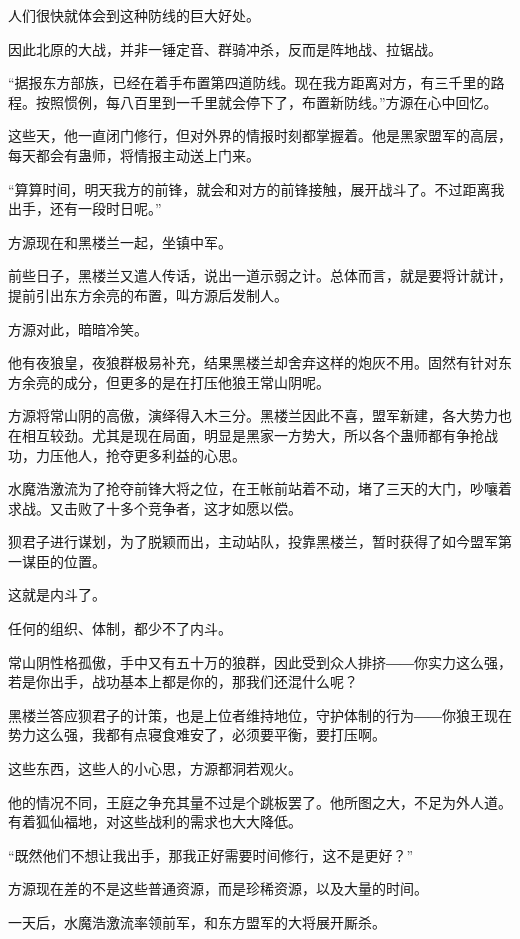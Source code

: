 \begin{this_body}
人们很快就体会到这种防线的巨大好处。

因此北原的大战，并非一锤定音、群骑冲杀，反而是阵地战、拉锯战。

“据报东方部族，已经在着手布置第四道防线。现在我方距离对方，有三千里的路程。按照惯例，每八百里到一千里就会停下了，布置新防线。”方源在心中回忆。

这些天，他一直闭门修行，但对外界的情报时刻都掌握着。他是黑家盟军的高层，每天都会有蛊师，将情报主动送上门来。

“算算时间，明天我方的前锋，就会和对方的前锋接触，展开战斗了。不过距离我出手，还有一段时日呢。”

方源现在和黑楼兰一起，坐镇中军。

前些日子，黑楼兰又遣人传话，说出一道示弱之计。总体而言，就是要将计就计，提前引出东方余亮的布置，叫方源后发制人。

方源对此，暗暗冷笑。

他有夜狼皇，夜狼群极易补充，结果黑楼兰却舍弃这样的炮灰不用。固然有针对东方余亮的成分，但更多的是在打压他狼王常山阴呢。

方源将常山阴的高傲，演绎得入木三分。黑楼兰因此不喜，盟军新建，各大势力也在相互较劲。尤其是现在局面，明显是黑家一方势大，所以各个蛊师都有争抢战功，力压他人，抢夺更多利益的心思。

水魔浩激流为了抢夺前锋大将之位，在王帐前站着不动，堵了三天的大门，吵嚷着求战。又击败了十多个竞争者，这才如愿以偿。

狈君子进行谋划，为了脱颖而出，主动站队，投靠黑楼兰，暂时获得了如今盟军第一谋臣的位置。

这就是内斗了。

任何的组织、体制，都少不了内斗。

常山阴性格孤傲，手中又有五十万的狼群，因此受到众人排挤――你实力这么强，若是你出手，战功基本上都是你的，那我们还混什么呢？

黑楼兰答应狈君子的计策，也是上位者维持地位，守护体制的行为――你狼王现在势力这么强，我都有点寝食难安了，必须要平衡，要打压啊。

这些东西，这些人的小心思，方源都洞若观火。

他的情况不同，王庭之争充其量不过是个跳板罢了。他所图之大，不足为外人道。有着狐仙福地，对这些战利的需求也大大降低。

“既然他们不想让我出手，那我正好需要时间修行，这不是更好？”

方源现在差的不是这些普通资源，而是珍稀资源，以及大量的时间。

一天后，水魔浩激流率领前军，和东方盟军的大将展开厮杀。


\end{this_body}
